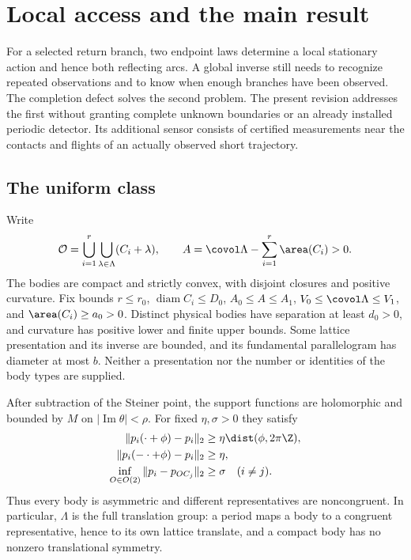 \section{Local access and the main result}\label{sec:setting}
For a selected return branch, two endpoint laws determine a local
stationary action and hence both reflecting arcs. A global inverse still
needs to recognize repeated observations and to know when enough
branches have been observed. The completion defect solves the second
problem. The present revision addresses the first without granting
complete unknown boundaries or an already installed periodic detector.
Its additional sensor consists of certified measurements near the
contacts and flights of an actually observed short trajectory.

\subsection{The uniform class}
Write
\[
 \mathcal O=\bigcup_{i=1}^r\bigcup_{\lambda\in\Lambda}(C_i+\lambda),
 \qquad A=\covol\Lambda-\sum_{i=1}^r\area(C_i)>0.
\]
The bodies are compact and strictly convex, with disjoint closures and
positive curvature. Fix bounds $r\le r_0$, $\operatorname{diam}C_i\le D_0$,
$A_0\le A\le A_1$, $V_0\le\covol\Lambda\le V_1$, and
$\area(C_i)\ge a_0>0$. Distinct physical bodies have separation at least
$d_0>0$, and curvature has positive lower and finite upper bounds.
Some lattice presentation and its inverse are bounded, and its
fundamental parallelogram has diameter at most $b$. Neither a presentation
nor the number or identities of the body types are supplied.

After subtraction of the Steiner point, the support functions are
holomorphic and bounded by $M$ on $|\operatorname{Im}\theta|<\rho$.
For fixed $\eta,\sigma>0$ they satisfy
\begin{align}
 \|p_i(\cdot+\phi)-p_i\|_2&\ge\eta\dist(\phi,2\pi\Z),\label{eq:rot}\\
 \|p_i(-\cdot+\phi)-p_i\|_2&\ge\eta,\label{eq:refl}\\
 \inf_{O\in O(2)}\|p_i-p_{OC_j}\|_2&\ge\sigma\quad(i\ne j).\label{eq:shape}
\end{align}
Thus every body is asymmetric and different representatives are
noncongruent. In particular, $\Lambda$ is the full translation group:
a period maps a body to a congruent representative, hence to its own
lattice translate, and a compact body has no nonzero translational symmetry.

